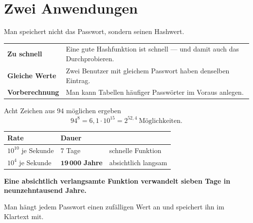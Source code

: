 \section{Zwei Anwendungen}

\begin{merksatz}
Man speichert nicht das Passwort, sondern seinen Hashwert.

\begin{center}
{\small
\renewcommand{\arraystretch}{1.5}
\begin{tabular}{@{}P{2.8cm}P{5.8cm}@{}}
\toprule
\textbf{Zu schnell} & Eine gute Hashfunktion ist schnell --- und damit auch das Durchprobieren.\\
\textbf{Gleiche Werte} & Zwei Benutzer mit gleichem Passwort haben denselben Eintrag.\\
\textbf{Vorberechnung} & Man kann Tabellen häufiger Passwörter im Voraus anlegen.\\
\bottomrule
\end{tabular}}
\end{center}

Acht Zeichen aus $94$ möglichen ergeben
\[ 94^{8} = 6{,}1\cdot10^{15} = 2^{52{,}4} \ \text{Möglichkeiten} . \]

\begin{center}
{\small
\renewcommand{\arraystretch}{1.48}
\begin{tabular}{@{}P{2.8cm}P{2.2cm}P{2.6cm}@{}}
\toprule
\textbf{Rate} & \textbf{Dauer} & \\
\midrule
$10^{10}$ je Sekunde & $7$ Tage & schnelle Funktion\\
$10^{4}$ je Sekunde & $\mathbf{19\,000}$ \textbf{Jahre} & absichtlich langsam\\
\bottomrule
\end{tabular}}
\end{center}

\begin{center}
\begin{minipage}{0.9\textwidth}
\textbf{Eine absichtlich verlangsamte Funktion verwandelt sieben Tage in neunzehntausend Jahre.}
\end{minipage}
\end{center}

Man hängt jedem Passwort einen zufälligen Wert an und speichert ihn im Klartext mit.

\begin{center}
\begin{minipage}{0.88\textwidth}
\end{minipage}
\end{center}
\end{merksatz}

